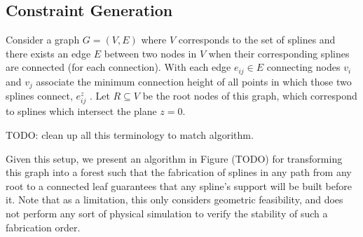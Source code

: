 \documentclass[conference]{acmsiggraph}
\begin{document}
\subsection{Constraint Generation}

Consider a graph $G = (V, E)$ where $V$ corresponds to the set of splines and there exists an edge $E$ between two nodes in $V$ when their corresponding splines are connected (for each connection).  With each edge $e_{ij} \in E$ connecting nodes $v_i$ and $v_j$ associate the minimum connection height of all points in which those two splines connect, $e_{ij}^z$
.  Let $R \subseteq V$ be the root nodes of this graph, which correspond to splines which intersect the plane $z=0$.

TODO: clean up all this terminology to match algorithm.

Given this setup, we present an algorithm in Figure (TODO) for transforming this graph into a forest such that the fabrication of splines in any path from any root to a connected leaf guarantees that any spline's support will be built before it.  Note that as a limitation, this only considers geometric feasibility, and does not perform any sort of physical simulation to verify the stability of such a fabrication order.
\end{document}
